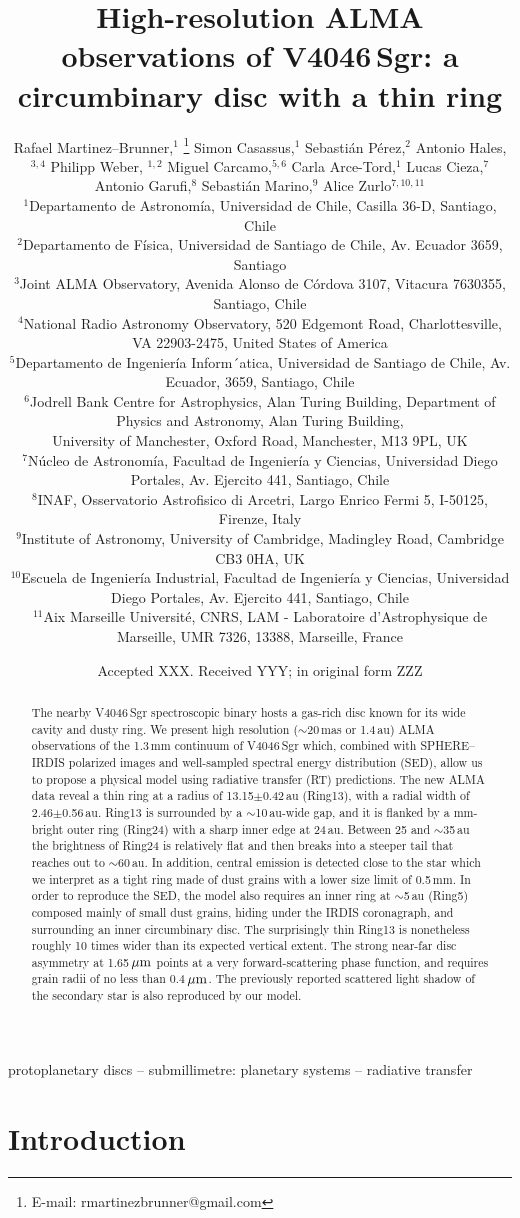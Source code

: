 \documentclass[fleqn,usenatbib,useAMS]{mnras}
\title[High-resolution ALMA observations of V4046\,Sgr]{High-resolution ALMA observations of V4046\,Sgr: a circumbinary disc with a thin ring}
\author[R. Martinez Brunner et al.]{Rafael Martinez--Brunner,$^{1}$
\thanks{E-mail: rmartinezbrunner@gmail.com}
Simon Casassus,$^{1}$
Sebasti\'an P\'erez,$^{2}$
Antonio Hales,$^{3,4}$
Philipp Weber, $^{1,2}$ \newauthor
Miguel Carcamo,$^{5,6}$
Carla Arce-Tord,$^{1}$
Lucas Cieza,$^{7}$
Antonio Garufi,$^{8}$
Sebasti\'an Marino,$^{9}$
Alice Zurlo$^{7,10,11}$
\\
$^{1}$Departamento de Astronom\'ia, Universidad de Chile, Casilla 36-D, Santiago, Chile\\
$^{2}$Departamento de F\'isica, Universidad de Santiago de Chile, Av. Ecuador 3659, Santiago\\
$^{3}$Joint ALMA Observatory, Avenida Alonso de C\'ordova 3107, Vitacura 7630355, Santiago, Chile \\
$^{4}$National Radio Astronomy Observatory, 520 Edgemont Road, Charlottesville, VA 22903-2475, United States of America \\
$^{5}$Departamento de Ingenier\'ia Inform´atica, Universidad de Santiago de Chile, Av. Ecuador, 3659, Santiago, Chile\\
$^{6}$Jodrell Bank Centre for Astrophysics, Alan Turing Building, Department of Physics and Astronomy, Alan Turing Building,\\ University of Manchester, Oxford Road, Manchester, M13 9PL, UK \\
$^{7}$N\'ucleo de Astronom\'ia, Facultad de Ingenier\'ia y Ciencias, Universidad Diego Portales, Av. Ejercito 441, Santiago, Chile\\
$^{8}$INAF, Osservatorio Astrofisico di Arcetri, Largo Enrico Fermi 5, I-50125, Firenze, Italy\\
$^{9}$Institute of Astronomy, University of Cambridge, Madingley Road, Cambridge CB3 0HA, UK\\
$^{10}$Escuela de Ingenier\'ia Industrial, Facultad de Ingenier\'ia y Ciencias, Universidad Diego Portales, Av. Ejercito 441, Santiago, Chile \\
$^{11}$Aix Marseille Universit\'e, CNRS, LAM - Laboratoire d'Astrophysique de Marseille, UMR 7326, 13388, Marseille, France  \\
}
\date{Accepted XXX. Received YYY; in original form ZZZ}
\begin{document}
\label{firstpage}
\pagerange{\pageref{firstpage}--\pageref{lastpage}}
\maketitle

\begin{abstract}
    The nearby V4046\,Sgr spectroscopic binary hosts a gas-rich disc known for its wide cavity and dusty ring. We present high resolution ($\sim$20\,mas or 1.4\,au) ALMA observations of the 1.3\,mm continuum of V4046\,Sgr which, combined with SPHERE--IRDIS polarized images and well-sampled spectral energy distribution (SED), allow us to propose a physical model using radiative transfer (RT) predictions. The new ALMA data reveal a thin ring at a radius of 13.15$\pm$0.42\,au (Ring13), with a radial width of 2.46$\pm$0.56\,au. Ring13 is surrounded by a $\sim$10\,au-wide gap, and it is flanked by a mm-bright outer ring (Ring24) with a sharp inner edge at 24\,au. Between 25 and $\sim$35\,au the brightness of Ring24 is relatively flat and then breaks into a steeper tail that reaches out to $\sim$60\,au. In addition, central emission is detected close to the star which we interpret as a tight ring made of dust grains with a lower size limit of 0.5\,mm. In order to reproduce the SED, the model also requires an inner ring at $\sim$5\,au (Ring5) composed mainly of small dust grains, hiding under the IRDIS coronagraph, and surrounding an inner circumbinary disc. The surprisingly thin Ring13 is nonetheless roughly 10 times wider than its expected vertical extent. The strong near-far disc asymmetry at 1.65\,$\hbox{$\mu$m}$ points at a very forward-scattering phase function, and requires grain radii of no less than 0.4\,$\hbox{$\mu$m}$. The previously reported scattered light shadow of the secondary star is also reproduced by our model.
\end{abstract}

\begin{keywords}
 protoplanetary discs -- submillimetre: planetary systems -- radiative transfer
\end{keywords}



\section{Introduction} \label{sec:Introduction}
\end{document}
